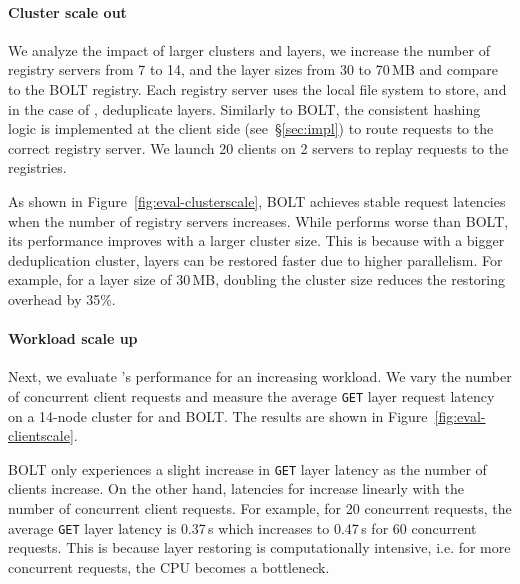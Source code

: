 
\paragraph{Cluster scale out}
%
We analyze the impact of larger clusters and layers, we increase the number of registry servers from
7 to 14, and the layer sizes from 30 to 70\,MB and compare \sysname to the BOLT registry.
%
%
Each registry server uses the local file system to store, and in the case of \sysname, deduplicate layers.
%
Similarly to BOLT, the consistent hashing logic is implemented at the client
side (see~\S\ref{sec:impl}) to route requests to the correct registry server.
We launch 20 clients on 2 servers to replay requests to the registries.

As shown in Figure~\ref{fig:eval-clusterscale}, BOLT achieves stable request latencies when
the number of registry servers increases.
%
While \sysname performs worse than BOLT, its performance improves with a larger cluster size.
%
This is because with a bigger deduplication cluster, layers can be restored faster due to higher
parallelism.
%
For example, for a layer size of 30\,MB, doubling the cluster size reduces the restoring
overhead by 35\%.

\paragraph{Workload scale up}
%
Next, we evaluate \sysname{}'s performance for an increasing workload.
%
We vary the number of concurrent client requests and measure the average \texttt{GET} layer
request latency on a 14-node cluster for \sysname and BOLT.
%
The results are shown in Figure~\ref{fig:eval-clientscale}.

BOLT only experiences a slight increase in \texttt{GET} layer latency as the number of clients increase.
%
On the other hand, latencies for \sysname increase linearly with the number of concurrent client requests.
%
For example, for 20 concurrent requests, the average \texttt{GET} layer latency is 0.37\,s which
increases to 0.47\,s for 60 concurrent requests.
%
This is because layer restoring is computationally intensive, i.e. for more concurrent requests, the CPU
becomes a bottleneck.

